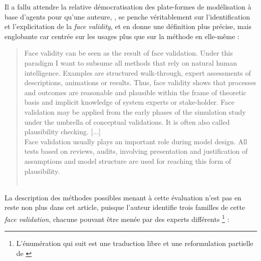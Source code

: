 Il a fallu attendre la relative démocratisation des plate-formes de modélisation à base d'agents pour qu'une auteure, \citeauthor{klugl_validation_2008}, se penche véritablement sur l'identification et l'explicitation de la \textit{face validity}, et en donne une définition plus précise, mais englobante car centrée sur les usages plus que sur la méthode en elle-même :

\begin{quotation}
	\noindent \og
	Face validity can be seen as the result of face validation. Under this paradigm I want to subsume all methods that rely on natural human intelligence.
	Examples are structured walk-through, expert assessments of descriptions, animations or results.
	Thus, face validity shows that processes and outcomes are reasonable and plausible within the frame of theoretic basis and implicit knowledge of system experts or stake-holder.
	Face validation may be applied from the early phases of the simulation study under the umbrella of conceptual validations.
	It is often also called plausibility checking.
	[...]\\
	Face validation usually plays an important role during model design.
	All tests based on reviews, audits, involving presentation and justification of assumptions and model structure are used for reaching this form of plausibility.
	\fg{}\\
	\mbox{}~ \hfill \textcite[39--41]{klugl_validation_2008}
\end{quotation}


La description des méthodes possibles menant à cette évaluation n'est pas en reste non plus dans cet article, puisque l'auteur identifie trois familles de cette \textit{face validation}, chacune pouvant être menée par des experts différents \footnote{
	L'énumération qui suit est une traduction libre et une reformulation partielle de \textcite[41-42]{klugl_validation_2008}
} :

